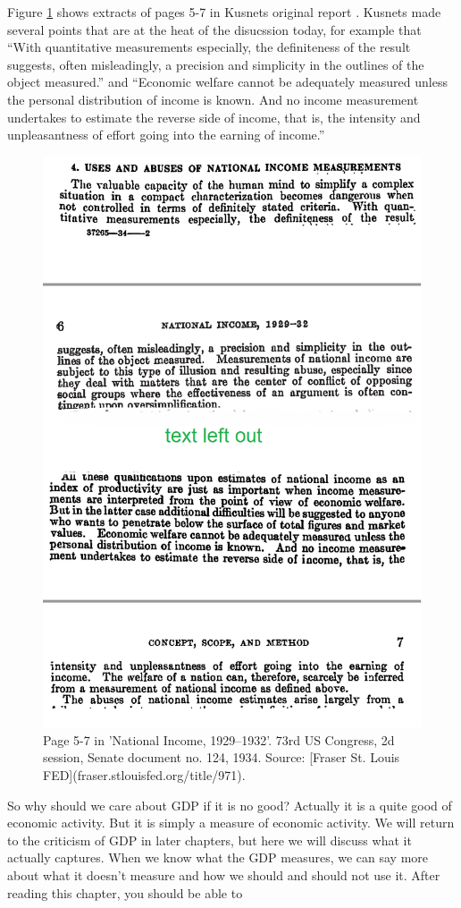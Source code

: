 \documentclass[]{book}
\begin{document}
Figure \ref{fig:gdp2} shows extracts of pages 5-7 in Kusnets original report \citep{kuznets1934national}. Kusnets made several points that are at the heat of the disucssion today, for example that ``With quantitative measurements especially, the definiteness of the result suggests, often misleadingly, a precision and simplicity in the outlines of the object measured.'' and ``Economic welfare cannot be adequately measured unless the personal distribution of income is known. And no income measurement undertakes to estimate the reverse side of income, that is, the intensity and unpleasantness of effort going into the earning of income.''

\begin{figure}

{\centering \includegraphics[width=0.7\linewidth]{_resources/chapter_gdp/kusnetz2} 

}

\caption{Page 5-7 in 'National Income, 1929–1932'. 73rd US Congress, 2d session, Senate document no. 124, 1934. Source:  [Fraser St. Louis FED](fraser.stlouisfed.org/title/971). }\label{fig:gdp2}
\end{figure}

So why should we care about GDP if it is no good? Actually it is a quite good of economic activity. But it is simply a measure of economic activity. We will return to the criticism of GDP in later chapters, but here we will discuss what it actually captures. When we know what the GDP measures, we can say more about what it doesn't measure and how we should and should not use it. After reading this chapter, you should be able to
\end{document}
